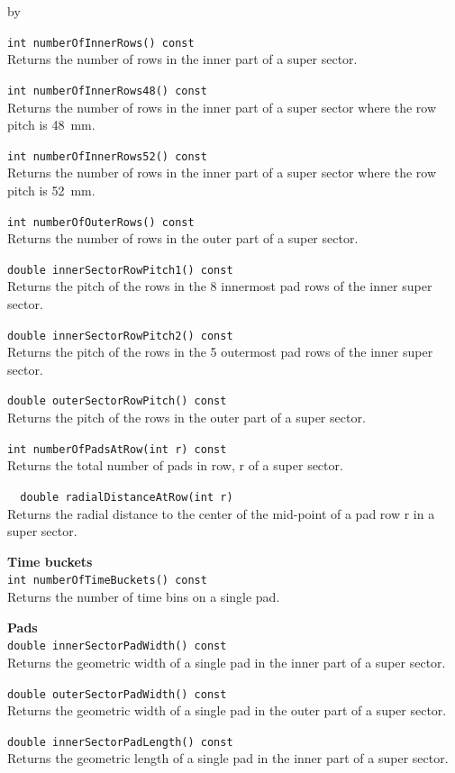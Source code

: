 \documentclass[twoside]{article}
\newcommand{\entrylabel}[1]{\mbox{\textbf{{#1}}}\hfil}%
\newenvironment{entry}
{\begin{list}{}%
    {\renewcommand{\makelabel}{\entrylabel}%
     \setlength{\labelwidth}{90pt}%
     \setlength{\leftmargin}{\labelwidth}
     \advance\leftmargin by \labelsep%
      }%
    }%
  {\end{list}}
\newcommand{\Entrylabel}[1]%
{\raisebox{0pt}[1ex][0pt]{\makebox[\labelwidth][l]%
    {\parbox[t]{\labelwidth}{\hspace{0pt}\textbf{{#1}}}}}}
\newenvironment{Entry}%
{\renewcommand{\entrylabel}{\Entrylabel}\begin{entry}}%
  {\end{entry}}
\begin{document}
\begin{Entry}
  \verb+int numberOfInnerRows() const+\\
  Returns the number of rows in the inner part of a super sector.

  \verb+int numberOfInnerRows48() const+\\
  Returns the number of rows in the inner part of a super sector
  where the row pitch is 48~mm.

  \verb+int numberOfInnerRows52() const+\\
  Returns the number of rows in the inner part of a super sector
  where the row pitch is 52~mm.

  \verb+int numberOfOuterRows() const+\\
  Returns the number of rows in the outer part of a super sector.

  \verb+double innerSectorRowPitch1() const+\\
  Returns the pitch of the rows in the 8 innermost pad rows
  of the inner super sector.

  \verb+double innerSectorRowPitch2() const+\\
  Returns the pitch of the rows in the 5 outermost pad rows
  of the inner super sector.

  \verb+double outerSectorRowPitch() const+\\
  Returns the pitch of the rows in the outer part of a super 
  sector.
    
  \verb+int numberOfPadsAtRow(int r) const+\\
  Returns the total number of pads in row, r of a super sector.

  \verb+  double radialDistanceAtRow(int r)+\\
  Returns the radial distance to the center of the mid-point
  of a pad row r in a super sector.

  {\bf Time buckets \\}
  \verb+int numberOfTimeBuckets() const+\\
  Returns the number of time bins on a single pad.
    
  {\bf Pads \\}
  \verb+double innerSectorPadWidth() const+\\
  Returns the geometric width of a single pad in the inner part
  of a super sector.

  \verb+double outerSectorPadWidth() const+\\
  Returns the geometric width of a single pad in the outer part
  of a super sector.

  \verb+double innerSectorPadLength() const+\\
  Returns the geometric length of a single pad in the inner
  part of a super sector.


\end{Entry}
\end{document}

